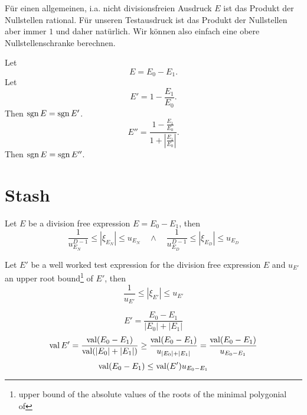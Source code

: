 Für einen allgemeinen, i.a. nicht divisionsfreien Ausdruck $E$
ist das Produkt der Nullstellen rational. Für unseren Testausdruck
ist das Produkt der Nullstellen aber immer $1$ und daher natürlich.
Wir können also einfach eine obere Nullstellenschranke berechnen.

Let
\begin{equation}
  E = E_0 - E_1.
\end{equation}
Let
\begin{equation}
  E' = 1 - \frac{E_1}{E_0}.
\end{equation}
Then $\operatorname{sgn} E = \operatorname{sgn} E'$.
\begin{equation}
  E'' = \frac{1 - \frac{E_1}{E_0}}{1 + \left|\frac{E_1}{E_0}\right|}.
\end{equation}
Then $\operatorname{sgn} E = \operatorname{sgn} E''$.






\section{Stash}


\noindent Let $E$ be a division free expression $E=E_0-E_1$,
then
\begin{equation}
  \frac{1}{u_{E_N}^{D-1}} \le |\xi_{E_N}| \le u_{E_N}
  \quad\land\quad
  \frac{1}{u_{E_D}^{D-1}} \le |\xi_{E_D}| \le u_{E_D}
\end{equation}





\noindent Let $E'$ be a well worked test expression for the 
division free expression $E$
and $u_{E'}$ an upper root bound\footnote{
upper bound of the absolute values of the roots of the minimal polygonial of}
of $E'$, then
\begin{equation}
  \frac{1}{u_{E'}} \le |\xi_{E'}| \le u_{E'}
\end{equation}


\begin{equation}
  E' = \frac{E_0-E_1}{|E_0|+|E_1|}
\end{equation}
\begin{equation}
  \mathop{\rm val}\nolimits E' =   \frac{\mathop{\rm val}\nolimits(E_0-E_1)}{\mathop{\rm val}\nolimits(|E_0|+|E_1|)}
          \ge \frac{\mathop{\rm val}\nolimits(E_0-E_1)}{u_{|E_0|+|E_1|}}
          =   \frac{\mathop{\rm val}\nolimits(E_0-E_1)}{u_{E_0-E_1}}
\end{equation}
\begin{equation}
  \mathop{\rm val}\nolimits(E_0-E_1) \le \mathop{\rm val}\nolimits(E') u_{E_0-E_1}
\end{equation}
